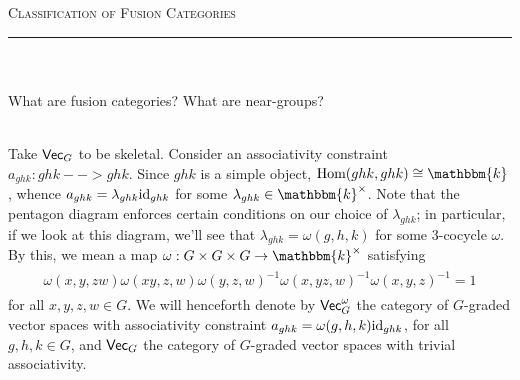 



\thispagestyle{fancy}

\begin{center}
\LARGE\scshape Classification of Fusion Categories\noindent\\[-\linespacing]
\rule{0.75\linewidth}{1pt}
\end{center}
\noindent\\[-0.75\linespacing]

\noindent\\ What are fusion categories? What are near-groups?\newpage

\noindent\\ Take $\textup{\textsf{Vec}}_G$ to be skeletal. Consider an associativity constraint $a_{ghk} : ghk --> ghk$. Since $ghk$ is a simple object, $\homset(ghk, ghk) \cong \mathbbm{k}$, whence $a_{ghk} = \lambda_{ghk}\textup{id}_{ghk}$ for some $\lambda_{ghk} \in \mathbbm{k}^\times$. Note that the pentagon diagram enforces certain conditions on our choice of $\lambda_{ghk}$; in particular, if we look at this diagram, we'll see that $\lambda_{ghk} = \omega(g, h, k)$ for some $3$-cocycle $\omega$. By this, we mean a map $\omega : G \times G \times G \to \mathbbm{k}^\times$ satisfying
\begin{align*}
\begin{split}
\omega(x, y, zw)\omega(xy, z, w)\omega(y, z, w)^{-1}\omega(x, yz, w)^{-1}\omega(x, y, z)^{-1} = 1
\end{split}
\end{align*}
for all $x, y, z, w \in G$. We will henceforth denote by $\textup{\textsf{Vec}}_G^\omega$ the category of $G$-graded vector spaces with associativity constraint $a_{ghk} = \omega(g, h, k)\textup{id}_{ghk}$, for all $g, h, k \in G$, and $\textup{\textsf{Vec}}_G$ the category of $G$-graded vector spaces with trivial associativity.\\

